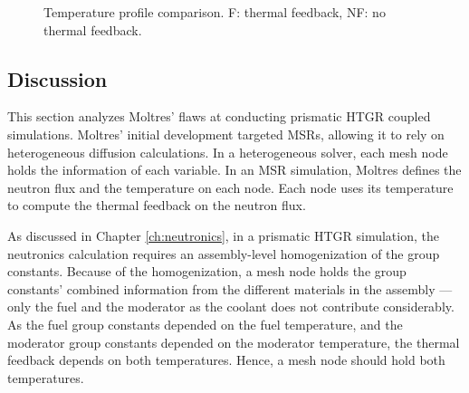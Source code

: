 \begin{figure}[htbp!]
  \centering
  \hfill
  \caption{Temperature profile comparison. F: thermal feedback, NF: no thermal feedback.}
  \label{fig:coupled-results-th}
\end{figure}

\subsection{Discussion}
\label{sec:discuss}

This section analyzes Moltres' flaws at conducting prismatic HTGR coupled simulations.
Moltres' initial development targeted MSRs, allowing it to rely on heterogeneous diffusion calculations.
In a heterogeneous solver, each mesh node holds the information of each variable.
In an MSR simulation, Moltres defines the neutron flux and the temperature on each node.
Each node uses its temperature to compute the thermal feedback on the neutron flux.

As discussed in Chapter \ref{ch:neutronics}, in a prismatic HTGR simulation, the neutronics calculation requires an assembly-level homogenization of the group constants.
Because of the homogenization, a mesh node holds the group constants' combined information from the different materials in the assembly --- only the fuel and the moderator as the coolant does not contribute considerably.
As the fuel group constants depended on the fuel temperature, and the moderator group constants depended on the moderator temperature, the thermal feedback depends on both temperatures.
Hence, a mesh node should hold both temperatures.

